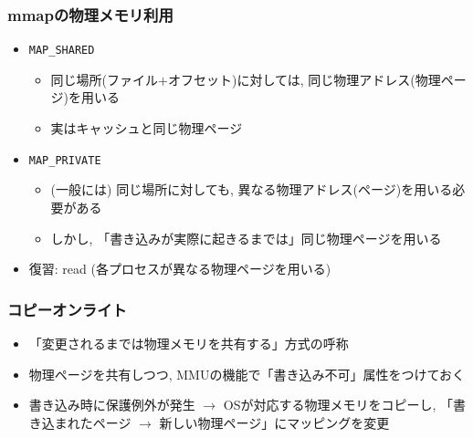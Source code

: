 \documentclass[12pt,dvipdfmx]{beamer}
\begin{document}
\begin{frame}
  \frametitle{mmapの物理メモリ利用}
  \begin{itemize}
  \item {\tt MAP\_SHARED}
    \begin{itemize}
    \item 同じ場所(ファイル$+$オフセット)に対しては,
      同じ物理アドレス(物理ページ)を用いる
    \item 実はキャッシュと同じ物理ページ
    \end{itemize}
  \item<2-> {\tt MAP\_PRIVATE}
    \begin{itemize}
    \item (一般には) 同じ場所に対しても, 異なる物理アドレス(ページ)を用いる必要がある
    \item しかし, 「書き込みが実際に起きるまでは」同じ物理ページを用いる
    \end{itemize}
  \item<5-> 復習: read (各プロセスが異なる物理ページを用いる)
  \end{itemize}

  \begin{center}
  \end{center}
\end{frame}

\begin{frame}
  \frametitle{コピーオンライト}
  \begin{itemize}
  \item 「変更されるまでは物理メモリを共有する」方式の呼称
  \item<1-> 物理ページを共有しつつ, MMUの機能で「書き込み不可」属性をつけておく
  \item<2-> 書き込み時に保護例外が発生 $\rightarrow$ OSが対応する物理メモリをコピーし,
    「書き込まれたページ $\rightarrow$ 新しい物理ページ」にマッピングを変更
  \end{itemize}
  \begin{center}
\end{center}
\end{frame}
\end{document}
